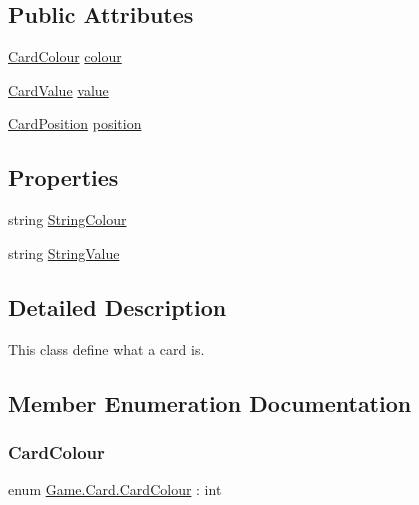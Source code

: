 \subsection*{Public Attributes}
\begin{DoxyCompactItemize}
\item 
\hyperlink{class_game_1_1_card_a76a5a259d3d61f379fb2354192753789}{Card\+Colour} \hyperlink{class_game_1_1_card_a6b201acd3a84a137384c52303de942d2}{colour}
\item 
\hyperlink{class_game_1_1_card_a17c2bb5fb12e206639e218492d78578a}{Card\+Value} \hyperlink{class_game_1_1_card_aa59c1833ffad11e084d5ebb552a4698e}{value}
\item 
\hyperlink{class_game_1_1_card_a9b35cee58d08386bc6f1d3cc7e6c6999}{Card\+Position} \hyperlink{class_game_1_1_card_abf7379cf3858aa12e7ffb3440156a0d7}{position}
\end{DoxyCompactItemize}
\subsection*{Properties}
\begin{DoxyCompactItemize}
\item 
string \hyperlink{class_game_1_1_card_afaad8a7eae5f1e7df1cde0428e470179}{String\+Colour}
\item 
string \hyperlink{class_game_1_1_card_aa0426a552479da58e7965a9d0fd3f1fd}{String\+Value}
\end{DoxyCompactItemize}


\subsection{Detailed Description}
This class define what a card is. 

\subsection{Member Enumeration Documentation}
\mbox{\label{class_game_1_1_card_a76a5a259d3d61f379fb2354192753789}} 
\subsubsection{\texorpdfstring{Card\+Colour}{CardColour}}
{\footnotesize\ttfamily enum \hyperlink{class_game_1_1_card_a76a5a259d3d61f379fb2354192753789}{Game.\+Card.\+Card\+Colour} \+: int\hspace{0.3cm}{\ttfamily [strong]}}

